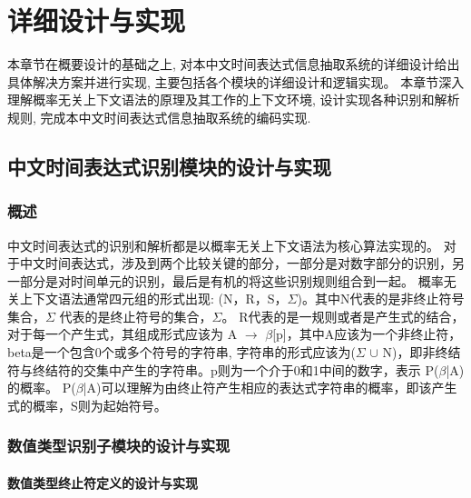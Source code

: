 
\chapter{详细设计与实现}

本章节在概要设计的基础之上, 对本中文时间表达式信息抽取系统的详细设计给出具体解决方案并进行实现, 主要包括各个模块的详细设计和逻辑实现。
本章节深入理解概率无关上下文语法的原理及其工作的上下文环境, 设计实现各种识别和解析规则, 完成本中文时间表达式信息抽取系统的编码实现.

\section{中文时间表达式识别模块的设计与实现}

\subsection{概述}

中文时间表达式的识别和解析都是以概率无关上下文语法为核心算法实现的。
对于中文时间表达式，涉及到两个比较关键的部分，一部分是对数字部分的识别，另一部分是对时间单元的识别，最后是有机的将这些识别规则组合到一起。
概率无关上下文语法通常四元组的形式出现: (N，R，S，$\varSigma$)。其中N代表的是非终止符号集合，$\varSigma$ 代表的是终止符号的集合，$\varSigma$。
R代表的是一规则或者是产生式的结合，对于每一个产生式，其组成形式应该为 A $\rightarrow$ $\beta$[p]，其中A应该为一个非终止符，beta是一个包含0个或多个符号的字符串,
字符串的形式应该为($\varSigma$ $\cup$ N)，即非终结符与终结符的交集中产生的字符串。p则为一个介于0和1中间的数字，表示 P($\beta$|A)的概率。
P($\beta$|A)可以理解为由终止符产生相应的表达式字符串的概率，即该产生式的概率，S则为起始符号。

\subsection{数值类型识别子模块的设计与实现}

\subsubsection{数值类型终止符定义的设计与实现}

